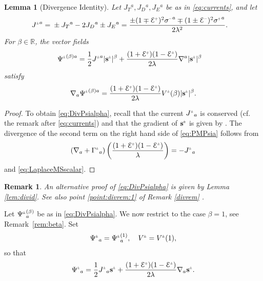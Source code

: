 \documentclass[a4paper,10pt,reqno]{amsart}
\newcommand{\red}[1]{{\color{red}{#1}}}
\newcommand{\Reals}{\mathbb{R}}
\theoremstyle{plain}
\newtheorem{lemma}[thm]{Lemma}
\newtheorem{remark}[thm]{Remark}
\renewcommand{\P}[1]{{{#1}^{\hspace{-.5pt}\scaleto{+}{4pt}}}}
\newcommand{\M}[1]{{{#1}^{\hspace{-.5pt}\scaleto{-}{4pt}}}}
\newcommand{\PM}[1]{{{#1}^{\hspace{-.5pt}\scaleto{\pm}{3.5pt}}}}
\newcommand{\MP}[1]{{{#1}^{\hspace{-.5pt}\scaleto{\mp}{3.5pt}}}}
\def\Ecal{\mathcal{E}}
\def\sbold{\mathbf{s}}
\numberwithin{equation}{section}
\begin{document}
\begin{lemma}[Divergence Identity]
Let $J_{T}{}^{a}, J_{D}{}^{a}, J_{E}{}^{a}$ be as in \eqref{eq:currents}, and let  
\begin{align} \label{eq:Jcurrdef}
\PM{J}^{a}={}&\pm J_{T}{}^{a}  - 2 J_{D}{}^{a} \pm J_{E}{}^{a}
 = \frac{\pm (1 \mp \P{\Ecal})^2 \M{\sigma}^{a} \mp  (1 \pm \M{\Ecal})^2 \P{\sigma}^{a}}{2 \lambda^2}.
\end{align} 
For $\beta \in \Reals$,  the vector fields
\begin{align}
\PM{\Psi}^{(\beta)a}={}& \frac{1}{2} \PM{J}^{a} |\PM{\sbold}|^\beta
+ \frac{(1+\MP{\Ecal})(1-\PM{\Ecal})}{2\lambda}\nabla^{a}|\PM{\sbold}|^\beta \label{eq:PMPsia}
\end{align}
satisfy
\begin{align} \label{eq:DivPsialpha}
\nabla_a \PM{\Psi}^{(\beta)a} = \frac{(1 + \MP{\Ecal}) (1 -  \PM{\Ecal})}{2\lambda} \PM{V}(\beta) |\PM{\sbold}|^\beta.
\end{align}
\end{lemma}
\begin{proof}
To obtain  \eqref{eq:DivPsialpha}, recall that the
current $\PM{J}_a$ is conserved (cf. the remark after \eqref{eq:currents}) and that the gradient
of $\PM{\sbold}$ is given by \red{\eqref{eq:nablaMSscalar}}. The divergence of the second term on the right hand side of 
\eqref{eq:PMPsia} follows from 
\begin{align}
\left( \nabla_a + \PM{\Gamma}_a \right) \left( \frac{(1+\MP{\Ecal})(1-\PM{\Ecal})}{\lambda}\right) = - \PM{J}_{a}  \label{eq:nabla+Gamma}
\end{align}
and \eqref{eq:LaplaceMSscalar}.
\end{proof}
\begin{remark}
An alternative proof of \eqref{eq:DivPsialpha} is given by Lemma \ref{lem:divid}. See also point \eqref{point:divrem:1} of Remark \ref{divrem} .
\end{remark}

Let $\PM{\Psi}^{(\beta)}_a$ be as in \eqref{eq:DivPsialpha}. We now restrict to the case $\beta=1$, see Remark~\ref{rem:beta}. Set  
\begin{align} 
\PM{\Psi}_a  = \PM{\Psi}^{(1)}_a  , \quad \PM{V} = \PM{V}(1) ,
\end{align}
so that
\begin{align} \label{eq:Psi-def} 
\PM{\Psi}_a
= \frac{1}{2}\PM{J}_a \PM{\sbold}
+ \frac{(1+\MP{\Ecal})(1-\PM{\Ecal})}{2\lambda}\nabla_{a} \PM{\sbold} .
\end{align}
\end{document}
